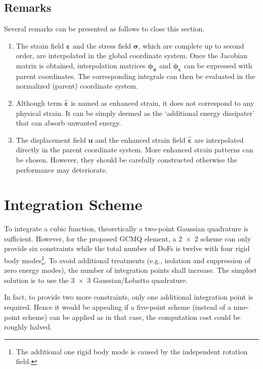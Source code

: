 \documentclass[3p,sort&compress,review,11pt]{elsarticle}
\begin{document}
\subsection{Remarks}
Several remarks can be presented as follows to close this section.
\begin{enumerate}
\item The strain field $\mathbold{\varepsilon}$ and the stress field $\mathbold{\sigma}$, which are complete up to second order, are interpolated in the global coordinate system. Once the Jacobian matrix is obtained, interpolation matrices $\mathbold{\phi}_\mathbold{\sigma}$ and $\mathbold{\phi}_\mathbold{\varepsilon}$ can be expressed with parent coordinates. The corresponding integrals can then be evaluated in the normalized (parent) coordinate system.
\item Although term $\hat{\mathbold{\varepsilon}}$ is named as enhanced strain, it does not correspond to any physical strain. It can be simply deemed as the `additional energy dissipater' that can absorb unwanted energy.
\item The displacement field $\mathbold{u}$ and the enhanced strain field $\hat{\mathbold{\varepsilon}}$ are interpolated directly in the parent coordinate system. More enhanced strain patterns can be chosen. However, they should be carefully constructed otherwise the performance may deteriorate.
\end{enumerate}
\section{Integration Scheme}
To integrate a cubic function, theoretically a two-point Gaussian quadrature is sufficient. However, for the proposed GCMQ element, a \num{2x2} scheme can only provide six constraints while the total number of DoFs is twelve with four rigid body modes\footnote{The additional one rigid body mode is caused by the independent rotation field.}. To avoid additional treatments (e.g., isolation and suppression of zero energy modes), the number of integration points shall increase. The simplest solution is to use the \num{3x3} Gaussian/Lobatto quadrature.

In fact, to provide two more constraints, only one additional integration point is required. Hence it would be appealing if a five-point scheme (instead of a nine-point scheme) can be applied as in that case, the computation cost could be roughly halved.
\end{document}

